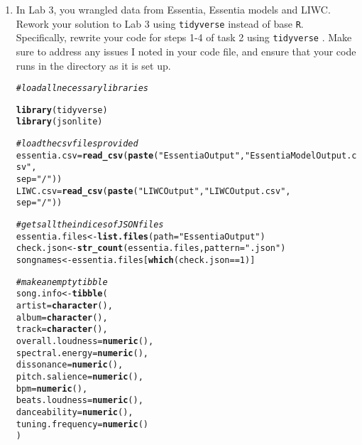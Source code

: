 \documentclass{article}\usepackage[]{graphicx}\usepackage[]{xcolor}
\makeatletter
\newcommand{\hlnum}[1]{\textcolor[rgb]{0.686,0.059,0.569}{#1}}%
\newcommand{\hlsng}[1]{\textcolor[rgb]{0.192,0.494,0.8}{#1}}%
\newcommand{\hlcom}[1]{\textcolor[rgb]{0.678,0.584,0.686}{\textit{#1}}}%
\newcommand{\hlopt}[1]{\textcolor[rgb]{0,0,0}{#1}}%
\newcommand{\hldef}[1]{\textcolor[rgb]{0.345,0.345,0.345}{#1}}%
\newcommand{\hlkwb}[1]{\textcolor[rgb]{0.69,0.353,0.396}{#1}}%
\newcommand{\hlkwc}[1]{\textcolor[rgb]{0.333,0.667,0.333}{#1}}%
\newcommand{\hlkwd}[1]{\textcolor[rgb]{0.737,0.353,0.396}{\textbf{#1}}}%
\newenvironment{kframe}{%
 \def\at@end@of@kframe{}%
 \ifinner\ifhmode%
  \def\at@end@of@kframe{\end{minipage}}%
  \begin{minipage}{\columnwidth}%
 \fi\fi%
 \def\FrameCommand##1{\hskip\@totalleftmargin \hskip-\fboxsep
 \colorbox{shadecolor}{##1}\hskip-\fboxsep
     \hskip-\linewidth \hskip-\@totalleftmargin \hskip\columnwidth}%
 \MakeFramed {\advance\hsize-\width
   \@totalleftmargin\z@ \linewidth\hsize
   \@setminipage}}%
 {\par\unskip\endMakeFramed%
 \at@end@of@kframe}
\newenvironment{knitrout}{}{} %
\makeatother
\begin{document}
\begin{enumerate}
\item In Lab 3, you wrangled data from Essentia, Essentia models and LIWC. Rework your 
solution to Lab 3 using \texttt{tidyverse} \citep{tidyverse} instead of base \texttt{R}.
Specifically, rewrite your code for steps 1-4 of task 2 using \texttt{tidyverse} \citep{tidyverse}. 
Make sure to address any issues I noted in your code file, and ensure that your code 
runs in the directory as it is set up.
\begin{knitrout}\scriptsize
{}\color{fgcolor}\begin{kframe}
\begin{alltt}
\hlcom{#load all necessary libraries}

\hlkwd{library}\hldef{(tidyverse)}
\hlkwd{library}\hldef{(jsonlite)}

\hlcom{#load the csv files provided}
\hldef{essentia.csv} \hlkwb{=} \hlkwd{read_csv}\hldef{(}\hlkwd{paste}\hldef{(}\hlsng{"EssentiaOutput"}\hldef{,} \hlsng{"EssentiaModelOutput.csv"}\hldef{,}
                              \hlkwc{sep} \hldef{=} \hlsng{"/"}\hldef{))}
\hldef{LIWC.csv} \hlkwb{=} \hlkwd{read_csv}\hldef{(}\hlkwd{paste}\hldef{(}\hlsng{"LIWCOutput"}\hldef{,} \hlsng{"LIWCOutput.csv"}\hldef{,}
                          \hlkwc{sep} \hldef{=} \hlsng{"/"}\hldef{))}

\hlcom{#gets all the indices of JSON files}
\hldef{essentia.files} \hlkwb{<-} \hlkwd{list.files}\hldef{(}\hlkwc{path} \hldef{=} \hlsng{"EssentiaOutput"}\hldef{)}
\hldef{check.json} \hlkwb{<-} \hlkwd{str_count}\hldef{(essentia.files,} \hlkwc{pattern}\hldef{=}\hlsng{".json"}\hldef{)}
\hldef{songnames} \hlkwb{<-} \hldef{essentia.files[}\hlkwd{which}\hldef{(check.json} \hlopt{==} \hlnum{1}\hldef{)]}

\hlcom{#make an empty tibble}
\hldef{song.info} \hlkwb{<-} \hlkwd{tibble}\hldef{(}
  \hlkwc{artist} \hldef{=} \hlkwd{character}\hldef{(),}
  \hlkwc{album} \hldef{=} \hlkwd{character}\hldef{(),}
  \hlkwc{track} \hldef{=} \hlkwd{character}\hldef{(),}
  \hlkwc{overall.loudness} \hldef{=} \hlkwd{numeric}\hldef{(),}
  \hlkwc{spectral.energy} \hldef{=} \hlkwd{numeric}\hldef{(),}
  \hlkwc{dissonance} \hldef{=} \hlkwd{numeric}\hldef{(),}
  \hlkwc{pitch.salience} \hldef{=} \hlkwd{numeric}\hldef{(),}
  \hlkwc{bpm} \hldef{=} \hlkwd{numeric}\hldef{(),}
  \hlkwc{beats.loudness} \hldef{=} \hlkwd{numeric}\hldef{(),}
  \hlkwc{danceability} \hldef{=} \hlkwd{numeric}\hldef{(),}
  \hlkwc{tuning.frequency} \hldef{=} \hlkwd{numeric}\hldef{()}
\hldef{)}


\end{alltt}
\end{kframe}
\end{knitrout}
\end{enumerate}
\end{document}
